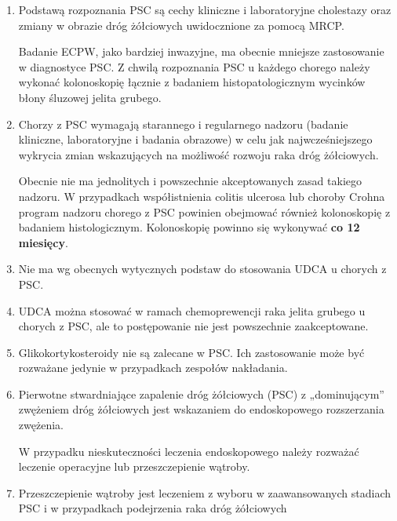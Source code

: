 \begin{enumerate}
    \item Podstawą rozpoznania PSC są cechy kliniczne  i  laboratoryjne  cholestazy  oraz zmiany w obrazie dróg żółciowych uwidocznione  za pomocą  MRCP.  
    
    Badanie ECPW,  jako  bardziej  inwazyjne,  ma obecnie  mniejsze  zastosowanie  w  diagnostyce  PSC.
    Z  chwilą  rozpoznania PSC u każdego chorego należy wykonać kolonoskopię łącznie z badaniem histopatologicznym wycinków błony śluzowej jelita  grubego.
    
    \item   Chorzy z PSC wymagają starannego i regularnego  nadzoru  (badanie  kliniczne, laboratoryjne i badania obrazowe) w celu jak  najwcześniejszego  wykrycia  zmian wskazujących na możliwość rozwoju raka dróg żółciowych. 
    
    Obecnie nie ma jednolitych  i  powszechnie  akceptowanych  zasad  takiego  nadzoru.  
    W  przypadkach współistnienia colitis ulcerosa lub choroby  Crohna  program nadzoru  chorego z PSC powinien obejmować również kolonoskopię  z  badaniem  histologicznym.
    Kolonoskopię powinno się wykonywać \textbf{co 12 miesięcy}.
    
    \item   Nie  ma  wg obecnych wytycznych podstaw  do  stosowania UDCA u chorych z PSC.
    
    \item   UDCA można stosować w  ramach  chemoprewencji  raka  jelita  grubego u chorych z PSC, ale to postępowanie nie  jest  powszechnie  zaakceptowane.
    
    \item   Glikokortykosteroidy  nie  są  zalecane w PSC. 
    Ich zastosowanie może być rozważane jedynie w przypadkach zespołów nakładania.
    
    \item Pierwotne  stwardniające  zapalenie  dróg żółciowych (PSC)  z  „dominującym”  zwężeniem dróg żółciowych jest wskazaniem do endoskopowego rozszerzania zwężenia. 
    
    W przypadku  nieskuteczności  leczenia  endoskopowego należy rozważać leczenie operacyjne lub przeszczepienie wątroby.
    
    \item   Przeszczepienie  wątroby  jest  leczeniem z wyboru w zaawansowanych stadiach PSC i w przypadkach podejrzenia raka dróg żółciowych
\end{enumerate}


